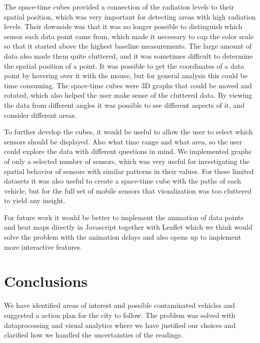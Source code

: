 \documentclass[journal]{vgtc}                %
\begin{document}
The space-time cubes provided a connection of the radiation levels to their spatial position, which was very important for detecting areas with high radiation levels. Their downside was that it was no longer possible to distinguish which sensor each data point came from, which made it necessary to cap the color scale so that it started above the highest baseline measurements. The large amount of data also made them quite cluttered, and it was sometimes difficult to determine the spatial position of a point. It was possible to get the coordinates of a data point by hovering over it with the mouse, but for general analysis this could be time consuming. The space-time cubes were 3D graphs that could be moved and rotated, which also helped the user make sense of the cluttered data. By viewing the data from different angles it was possible to see different aspects of it, and consider different areas. 

To further develop the cubes, it would be useful to allow the user to select which sensors should be displayed. Also what time range and what area, so the user could explore the data with different questions in mind. We implemented graphs of only a selected number of sensors, which was very useful for investigating the spatial behavior of sensors with similar patterns in their values. For these limited datasets it was also useful to create a space-time cube with the paths of each vehicle, but for the full set of mobile sensors that visualization was too cluttered to yield any insight. 

For future work it would be better to implement the animation of data points and heat maps directly in Javascript together with Leaflet\cite{Leaflet} which we think would solve the problem with the animation delays and also opens up to implement more interactive features. 

\section{Conclusions}
We have identified areas of interest and possible contaminated vehicles and suggested a action plan for the city to follow. The problem was solved with dataprocessing and visual analytics where we have justified our choices and clarified how we handled the uncertainties of the readings. 





\end{document}
